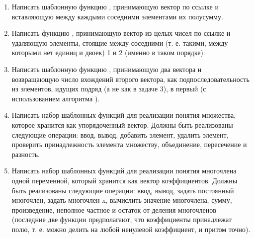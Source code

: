 \begin{enumerate}[leftmargin=*]
    \item Написать шаблонную функцию , принимающую вектор по ссылке и вставляющую между каждыми соседними элементами их полусумму.
    \item Написать функцию , принимающую вектор из целых чисел по ссылке и удаляющую элементы, стоящие между соседними (т. е. такими, между которыми нет единиц и двоек) 1 и 2 (именно в таком порядке).
    \item Написать шаблонную функцию , принимающую два вектора и возвращающую число вхождений второго вектора, как подпоследовательность из элементов, идущих подряд (а не как в задаче 3), в первый (с использованием алгоритма ).
    \item Написать набор шаблонных функций для реализации понятия множества, которое хранится как упорядоченный вектор. Должны быть реализованы следующие операции: ввод, вывод, добавить элемент, удалить элемент, проверить принадлежность элемента множеству, объединение, пересечение и разность.
    \item Написать набор шаблонных функций для реализации понятия многочлена одной переменной, который хранится как вектор коэффициентов. Должны быть реализованы следующие операции: ввод, вывод, задать постоянный многочлен, задать многочлен x, вычислить значение многочлена, сумму, произведение, неполное частное и остаток от деления многочленов (последние две функции предполагают, что коэффициенты принадлежат полю, т. е. можно делить на любой ненулевой коэффициент, и притом точно).
\end{enumerate}
